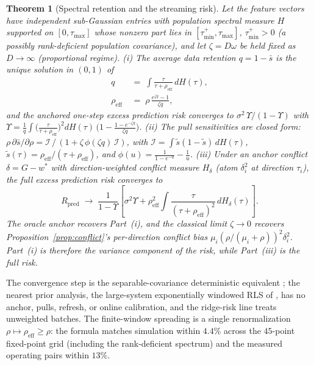 \documentclass[10pt]{article}
\newtheorem{theorem}{Theorem}
\begin{document}
\begin{theorem}[Spectral retention and the streaming risk]
\label{thm:rmt}
Let the feature vectors have independent sub-Gaussian entries with population spectral measure $H$ supported on $[0,\tau_{\max}]$ whose nonzero part lies in $[\tau_{\min}^+,\tau_{\max}]$, $\tau_{\min}^+>0$ (a possibly rank-deficient population covariance), and let $\zeta = D \omega$ be held fixed as $D \to\infty$ (proportional regime).
(i) The average data retention $q = 1 - \bar s$ is the unique solution in $(0,1)$ of
\[
\begin{aligned}
q \;&=\; \int \frac{\tau}{\tau + \rho_{\mathrm{eff}}}\, dH(\tau), \\
\rho_{\mathrm{eff}} \;&=\; \rho\,\frac{e^{\zeta q} - 1}{\zeta q},
\end{aligned}
\]
and the anchored one-step excess prediction risk converges to $\sigma^2\, \Upsilon/(1 - \Upsilon)$ with
$\Upsilon = \frac{1}{q}\int \bigl(\frac{\tau}{\tau + \rho_{\mathrm{eff}}}\bigr)^{2} dH(\tau)\,\bigl(1 - \frac{1 - e^{-\zeta q}}{\zeta q}\bigr)$.
(ii) The pull sensitivities are closed form: $\rho\, \partial \bar s / \partial \rho = \mathcal{I}\,/\,(1 + \zeta\,\phi(\zeta q)\,\mathcal{I})$, with $\mathcal{I} = \int \tilde s (1 - \tilde s)\, dH(\tau)$, $\tilde s(\tau) = \rho_{\mathrm{eff}}/(\tau + \rho_{\mathrm{eff}})$, and $\phi(u) = \tfrac{1}{1 - e^{-u}} - \tfrac{1}{u}$.
(iii) Under an anchor conflict $\delta = G - w^*$ with direction-weighted conflict measure $H_\delta$ (atom $\delta_i^2$ at direction $\tau_i$), the full excess prediction risk converges to
\[
R_{\mathrm{pred}} \;\longrightarrow\; \frac{1}{1 - \Upsilon}\left[\sigma^2 \Upsilon + \rho_{\mathrm{eff}}^2 \int \frac{\tau}{(\tau + \rho_{\mathrm{eff}})^2}\, dH_\delta(\tau)\right].
\]
The oracle anchor recovers Part~(i), and the classical limit $\zeta \to 0$ recovers Proposition~\ref{prop:conflict}'s per-direction conflict bias $\mu_i(\rho/(\mu_i+\rho))^2\delta_i^2$. Part~(i) is therefore the variance component of the risk, while Part~(iii) is the full risk.
\end{theorem}
The convergence step is the separable-covariance deterministic equivalent \citep{silverstein1995,rubio2011,hachem2007}; the nearest prior analysis, the large-system exponentially windowed RLS of \citet{xiao2005}, has no anchor, pulls, refresh, or online calibration, and the ridge-risk line \citep{hastie2022} treats unweighted batches.
The finite-window spreading is a single renormalization $\rho \mapsto \rho_{\mathrm{eff}} \ge \rho$: the formula matches simulation within $4.4\%$ across the $45$-point fixed-point grid (including the rank-deficient spectrum) and the measured operating pairs within $13\%$.
\end{document}
